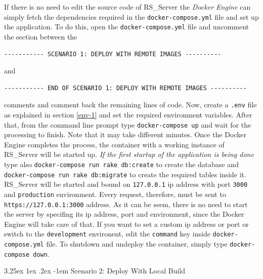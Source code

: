 \documentclass[a4paper, english]{article}
\makeatletter
\renewcommand\paragraph{\@startsection{paragraph}{5}{\z@}%
  {3.25ex \@plus1ex \@minus.2ex}%
  {-1em}%
  {\normalfont\normalsize\bfseries}}
\makeatother
\begin{document}
If there is no need to edit the source code of RS\_Server the \emph{Docker Engine} can simply fetch the dependencies required in the \verb|docker-compose.yml| file and set up the application. To do this, open the \verb|docker-compose.yml| file and uncomment the section between the 
\begin{verbatim}
----------- SCENARIO 1: DEPLOY WITH REMOTE IMAGES ----------
\end{verbatim}
and 
\begin{verbatim}
----------- END OF SCENARIO 1: DEPLOY WITH REMOTE IMAGES ----------
\end{verbatim} 
comments and comment back the remaining lines of code. Now, create a \verb|.env| file as explained in section \ref{env-1} and set the required environment variables. After that, from the command line prompt type \verb|docker-compose up| and wait for the processing to finish. Note that it may take different minutes. Once the Docker Engine completes the process, the container with a working instance of RS\_Server will be started up. \emph{If the first startup of the application is being done} type also \verb|docker-compose run rake db:create| to create the database and \verb|docker-compose run rake db:migrate| to create the required tables inside it. RS\_Server will be started and bound on \verb|127.0.0.1| ip address with port \verb|3000| and \verb|production| environment. Every request, therefore, must be sent to \verb|https://127.0.0.1:3000| address. As it can be seem, there is no need to start the server by specifing its ip address, port and environment, since the Docker Engine will take care of that. If you want to set a custom ip address or port or switch to the \verb|development| environent, edit the \verb|command| key inside \verb|docker-compose.yml| file. To shutdown and undeploy the container, simply type \verb|docker-compose down|.

\paragraph{Scenario 2: Deploy With Local Build}
\end{document}
